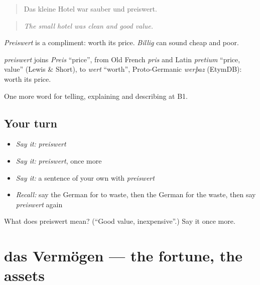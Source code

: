 \begin{quote}
Das kleine Hotel war sauber und preiswert.
\end{quote}

\begin{quote}
\emph{The small hotel was clean and good value.}
\end{quote}

\emph{Preiswert} is a compliment: worth its price. \emph{Billig} can sound cheap and poor.

\begin{cousinweb}
\emph{preiswert} joins \emph{Preis} \textquotedblleft{}price\textquotedblright{}, from Old French \emph{pris} and Latin \emph{pretium} \textquotedblleft{}price, value\textquotedblright{} (Lewis \& Short), to \emph{wert} \textquotedblleft{}worth\textquotedblright{}, Proto-Germanic \emph{werþaz} (EtymDB): worth its price.
\end{cousinweb}

\begin{grammarlens}[title={What you've built}]
One more word for telling, explaining and describing at B1.
\end{grammarlens}

\subsection*{Your turn}
\begin{itemize}
\raggedright
  \item \emph{Say it:} \emph{preiswert}
  \item \emph{Say it:} \emph{preiswert}, once more
  \item \emph{Say it:} a sentence of your own with \emph{preiswert}
  \item \emph{Recall:} say the German for to waste, then the German for the waste, then say \emph{preiswert} again
\end{itemize}

\begin{tcolorbox}[breakable,colback=teal!4,colframe=teal!35!black,title={Before you move on}]
What does preiswert mean? (\textquotedblleft{}Good value, inexpensive\textquotedblright{}.) Say it once more.
\end{tcolorbox}
\section[das Vermögen]{das Vermögen — the fortune, the assets}

\label{lesson:GE-C390-vermoegen}



